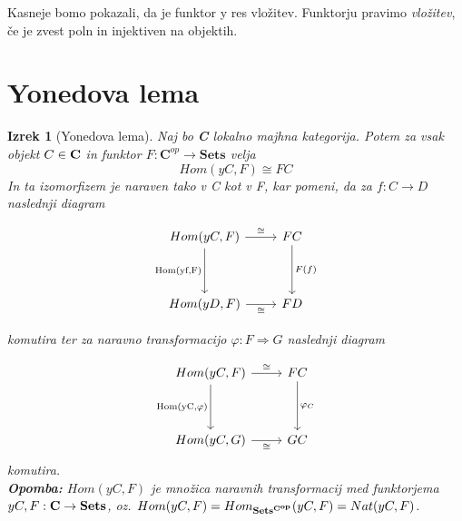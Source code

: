 \documentclass[12pt,a4paper]{book}
\theoremstyle{definition}
\theoremstyle{plain}
\newtheorem{izrek}{Izrek}[chapter]
\theoremstyle{definition}
\theoremstyle{remark}
\begin{document}
Kasneje bomo pokazali, da je funktor y res vložitev. Funktorju pravimo {\it vložitev}, če je zvest poln in injektiven na objektih.

\section{Yonedova lema}

\begin{izrek}[Yonedova lema]
Naj bo {\bf C} lokalno majhna kategorija. Potem za vsak objekt $C \in \bf{C}$ in funktor $F : \textbf{C}^{op} \to \textbf{Sets}$ velja
$$Hom(yC,F) \cong FC$$
In ta izomorfizem je naraven tako v C kot v F, kar pomeni, da za $f : C \to D$ naslednji diagram

\begin{equation} \label{diag1}
\begin{tikzcd}[row sep=huge]
Hom(yC,F) \arrow[r, "\cong"] \arrow[d, "\text{Hom(yf,F)}"'] & FC \arrow[d, "F(f)"] \\
Hom(yD,F) \arrow[r, "\cong"'] & FD
\end{tikzcd}
\end{equation}


komutira ter za naravno transformacijo $\varphi : F \Rightarrow G$ naslednji diagram

\begin{equation} \label{diag2}
\begin{tikzcd}[row sep=huge]
Hom(yC,F) \arrow[r, "\cong"] \arrow[d, "\text{Hom(yC,}\varphi\text{)}"'] & FC \arrow[d, "\varphi_C"] \\
Hom(yC,G) \arrow[r, "\cong"']	&	GC
\end{tikzcd}
\end{equation}
komutira. \\
\textbf{Opomba:} $Hom(yC,F)$ je množica naravnih transformacij med funktorjema $yC,F : \bf{C} \to \bf{Sets}$, oz. $Hom(yC,F) = Hom_{\bf{Sets}^{\textbf{C}^{op}}}(yC,F) = Nat(yC,F)$.

\end{izrek}
\end{document}
